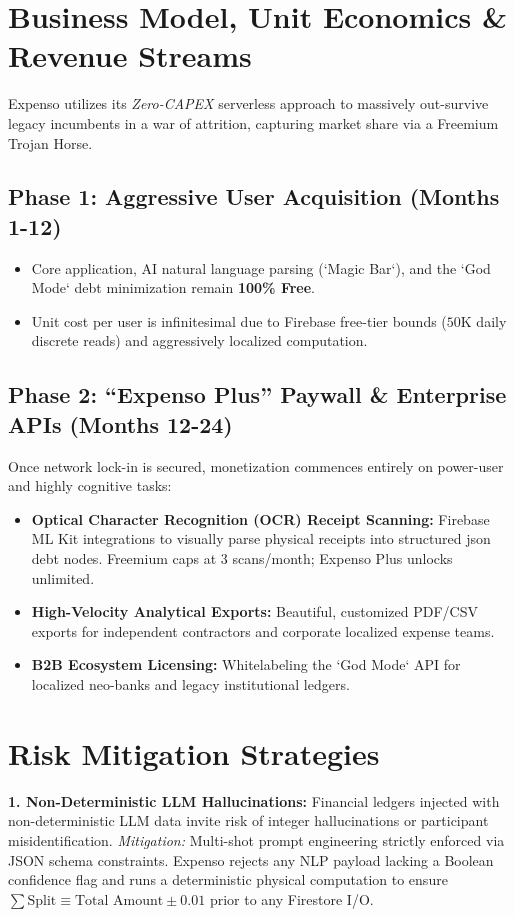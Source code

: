 \documentclass[11pt, letterpaper]{article}
\begin{document}
\section{Business Model, Unit Economics \& Revenue Streams}
Expenso utilizes its \textit{Zero-CAPEX} serverless approach to massively out-survive legacy incumbents in a war of attrition, capturing market share via a Freemium Trojan Horse.

\subsection{Phase 1: Aggressive User Acquisition (Months 1-12)}
\begin{itemize}
    \item Core application, AI natural language parsing (`Magic Bar`), and the `God Mode` debt minimization remain \textbf{100\% Free}.
    \item Unit cost per user is infinitesimal due to Firebase free-tier bounds ($50$K daily discrete reads) and aggressively localized computation.
\end{itemize}

\subsection{Phase 2: ``Expenso Plus'' Paywall \& Enterprise APIs (Months 12-24)}
Once network lock-in is secured, monetization commences entirely on power-user and highly cognitive tasks:
\begin{itemize}
    \item \textbf{Optical Character Recognition (OCR) Receipt Scanning:} Firebase ML Kit integrations to visually parse physical receipts into structured json debt nodes. Freemium caps at 3 scans/month; Expenso Plus unlocks unlimited.
    \item \textbf{High-Velocity Analytical Exports:} Beautiful, customized PDF/CSV exports for independent contractors and corporate localized expense teams.
    \item \textbf{B2B Ecosystem Licensing:} Whitelabeling the `God Mode` API for localized neo-banks and legacy institutional ledgers.
\end{itemize}

\section{Risk Mitigation Strategies}
\textbf{1. Non-Deterministic LLM Hallucinations:} Financial ledgers injected with non-deterministic LLM data invite risk of integer hallucinations or participant misidentification.
\textit{Mitigation:} Multi-shot prompt engineering strictly enforced via JSON schema constraints. Expenso rejects any NLP payload lacking a Boolean confidence flag and runs a deterministic physical computation to ensure $\sum \text{Split} \equiv \text{Total Amount} \pm 0.01$ prior to any Firestore I/O.
\end{document}
